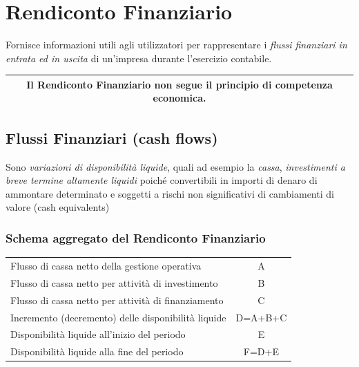 \documentclass[10pt,a4paper,fleqn,oneside]{book}
\newcommand{\textbox}[1]{
\vspace{1em}
\begin{center}
    \begin{tabular}{|c|}
        \hline
        #1\\
        \hline
    \end{tabular}
\end{center}
}
\newcommand{\grayrow}{\rowcolor[gray]{.90}}
\begin{document}


\section{Rendiconto Finanziario}

Fornisce informazioni utili agli utilizzatori per rappresentare i 
\emph{flussi finanziari in entrata ed in uscita}
 di un’impresa durante l’esercizio contabile.

\textbox{Il Rendiconto Finanziario non segue il principio di competenza economica.}

\subsection{Flussi Finanziari (cash flows)}
Sono \emph{variazioni di disponibilità liquide}, quali ad
esempio la \emph{cassa}, \emph{investimenti a breve termine altamente liquidi} poiché
convertibili in importi di denaro di ammontare determinato e soggetti a rischi
non significativi di cambiamenti di valore (cash equivalents)

\subsubsection{Schema aggregato del Rendiconto Finanziario}
\begin{tabular}{|l | c |}
    \hline
    Flusso di cassa netto della gestione operativa & A \\
    Flusso di cassa netto per attività di investimento & B \\
    Flusso di cassa netto per attività di finanziamento & C \\
    \hline\grayrow
    Incremento (decremento) delle disponibilità liquide & D=A+B+C \\
    \hline
    Disponibilità liquide all’inizio del periodo & E \\
    \hline\grayrow
    Disponibilità liquide alla fine del periodo & F=D+E \\
    \hline
\end{tabular}
\end{document}

